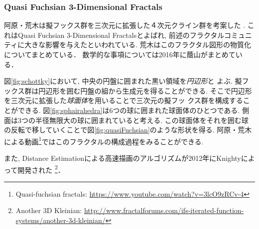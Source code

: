 \subsubsection{Quasi Fuchsian 3-Dimensional Fractals}

阿原・荒木は擬フックス群を三次元に拡張した４次元クライン群を考案した
\cite{sphairahedra}\cite{sphairahedraJa}.
これはQuasi Fuchsian 3-Dimensional Fractalsとよばれ,
前述のフラクタルコミュニティに大きな影響を与えたといわれている.
荒木はこのフラクタル図形の物質化についてまとめている\cite{materializing}．
数学的な事項については2016年に蔭山\cite{kageyama}がまとめている．

図\ref{fig:schottky}において, 中央の円盤に囲まれた黒い領域を\emph{円辺形}と
よぶ.
擬フックス群は円辺形を囲む円盤の組から生成元を得ることができる.
そこで円辺形を三次元に拡張した\emph{球面体}を用いることで三次元の擬フッ
クス群を構成することができる.
図\ref{fig:sphairahedra}は6つの球に囲まれた球面体のひとつである.
側面は3つの半径無限大の球に囲まれていると考える.
この球面体をそれを囲む球の反転で移していくことで図\ref{fig:quasiFuchsian}のような形状を得る.
阿原・荒木による動画\footnote{Quasi-fuchsian fractals:
\url{https://www.youtube.com/watch?v=3lcO9zRCv-4}}ではこのフラクタルの構成過程をみることができる.

また, Distance Estimationによる高速描画のアルゴリズムが2012年にKnightyによって開発された
\footnote{Another 3D Kleinian:
 \url{http://www.fractalforums.com/ifs-iterated-function-systems/another-3d-kleinian/}}．

